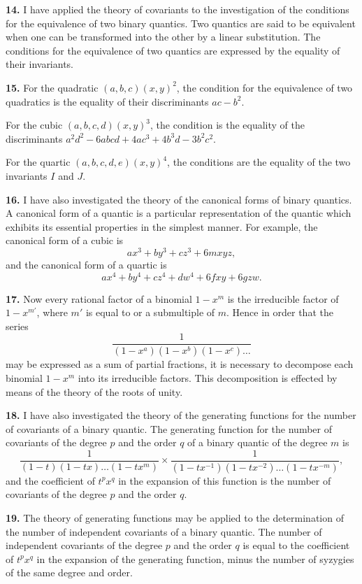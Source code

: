 \documentclass[11pt,a4paper]{book}
\begin{document}
\newpage
\setcounter{page}{252}

\textbf{14.} I have applied the theory of covariants to the investigation of the conditions for the equivalence of two binary quantics. Two quantics are said to be equivalent when one can be transformed into the other by a linear substitution. The conditions for the equivalence of two quantics are expressed by the equality of their invariants.

\textbf{15.} For the quadratic $(a, b, c)(x, y)^2$, the condition for the equivalence of two quadratics is the equality of their discriminants $ac - b^2$.

For the cubic $(a, b, c, d)(x, y)^3$, the condition is the equality of the discriminants $a^2d^2 - 6abcd + 4ac^3 + 4b^3d - 3b^2c^2$.

For the quartic $(a, b, c, d, e)(x, y)^4$, the conditions are the equality of the two invariants $I$ and $J$.

\textbf{16.} I have also investigated the theory of the canonical forms of binary quantics. A canonical form of a quantic is a particular representation of the quantic which exhibits its essential properties in the simplest manner. For example, the canonical form of a cubic is
\[
ax^3 + by^3 + cz^3 + 6mxyz,
\]
and the canonical form of a quartic is
\[
ax^4 + by^4 + cz^4 + dw^4 + 6fxy + 6gzw.
\]

\newpage
\setcounter{page}{253}

\textbf{17.} Now every rational factor of a binomial $1 - x^m$ is the irreducible factor of $1 - x^{m'}$, where $m'$ is equal to or a submultiple of $m$. Hence in order that the series
\[
\frac{1}{(1-x^a)(1-x^b)(1-x^c)\ldots}
\]
may be expressed as a sum of partial fractions, it is necessary to decompose each binomial $1 - x^m$ into its irreducible factors. This decomposition is effected by means of the theory of the roots of unity.

\textbf{18.} I have also investigated the theory of the generating functions for the number of covariants of a binary quantic. The generating function for the number of covariants of the degree $p$ and the order $q$ of a binary quantic of the degree $m$ is
\[
\frac{1}{(1-t)(1-tx)\ldots(1-tx^m)} \times \frac{1}{(1-tx^{-1})(1-tx^{-2})\ldots(1-tx^{-m})},
\]
and the coefficient of $t^p x^q$ in the expansion of this function is the number of covariants of the degree $p$ and the order $q$.

\newpage
\setcounter{page}{254}

\textbf{19.} The theory of generating functions may be applied to the determination of the number of independent covariants of a binary quantic. The number of independent covariants of the degree $p$ and the order $q$ is equal to the coefficient of $t^p x^q$ in the expansion of the generating function, minus the number of syzygies of the same degree and order.
\end{document}
